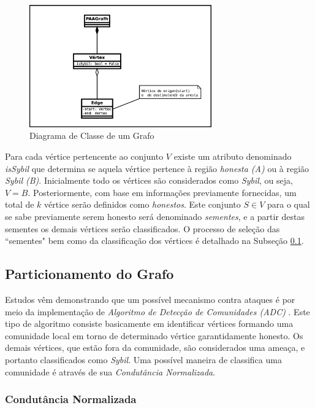 \documentclass[12pt]{article}
\begin{document}
\begin{figure}[ht]
\centering
\includegraphics[width=0.7\textwidth]{../img/cd_graph.eps}
\caption{Diagrama de Classe de um Grafo}
\label{fig:cd_graph}
\end{figure}


Para cada vértice pertencente ao conjunto $V$ existe um atributo denominado \textit{isSybil} que determina se aquela vértice pertence à região \emph{honesta (A)} ou à região \emph{Sybil (B)}. Inicialmente todo os vértices são considerados como \textit{Sybil}, ou seja, $V = B$. Posteriormente, com base em informações previamente fornecidas, um total de $k$ vértice serão definidos como \textit{honestos}. Este conjunto $S \in V$ para o qual se sabe previamente serem honesto será denominado \textit{sementes}, e a partir destas sementes os demais vértices serão classificados. O processo de seleção das ``sementes" bem como da classificação dos vértices é detalhado na Subseção \ref{subsec:particao}{}.

\subsection{Particionamento do Grafo}
\label{subsec:particao}

Estudos vêm demonstrando que um possível mecanismo contra ataques é por meio da implementação de \textit{Algoritmo de Detecção de Comunidades (ADC)} \cite{viswanath2011analysis}. Este tipo de algoritmo consiste basicamente em identificar vértices formando uma comunidade local em torno de determinado vértice garantidamente honesto. Os demais vértices, que estão fora da comunidade, são considerados uma ameaça, e portanto classificados como \textit{Sybil}. Uma possível maneira de classifica uma comunidade é através de sua \textit{Condutância Normalizada}.

\subsubsection{Condutância Normalizada}
\label{subsubsec:condutancia_normalizada}
\end{document}
